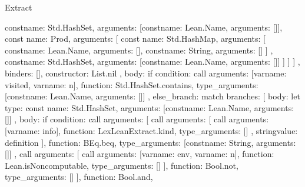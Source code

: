 \begin{lexlean}{Extract}
\begin{toolingmodule}
{{{{{{                    const{name: Std.HashSet, arguments: [const{name: Lean.Name, arguments: []}]},
                    const{
                      name: Prod,
                      arguments: [
                        const{
                          name: Std.HashMap,
                          arguments: [
                            const{name: Lean.Name, arguments: []},
                            const{name: String, arguments: []}
                          ]
                        },
                        const{name: Std.HashSet, arguments: [const{name: Lean.Name, arguments: []}]}
                      ]
                    }
                  ]
                }
              ]
            },
            binders: [],
            constructor: List.nil
          },
          {
            body: if{
              condition: call{
                arguments: [var{name: visited}, var{name: n}],
                function: Std.HashSet.contains,
                type_arguments: [const{name: Lean.Name, arguments: []}]
              },
              else_branch: match{
                branches: [
                  {
                    body: let{
                      type: const{
                        name: Std.HashSet,
                        arguments: [const{name: Lean.Name, arguments: []}]
                      },
                      body: if{
                        condition: call{
                          arguments: [
                            call{
                              arguments: [
                                call{
                                  arguments: [var{name: info}],
                                  function: LexLeanExtract.kind,
                                  type_arguments: []
                                },
                                string{value: definition}
                              ],
                              function: BEq.beq,
                              type_arguments: [const{name: String, arguments: []}]
                            },
                            call{
                              arguments: [
                                call{
                                  arguments: [var{name: env}, var{name: n}],
                                  function: Lean.isNoncomputable,
                                  type_arguments: []
                                }
                              ],
                              function: Bool.not,
                              type_arguments: []
                            }
                          ],
                          function: Bool.and,
}}}}}}}}}}
\end{toolingmodule}
\end{lexlean}
